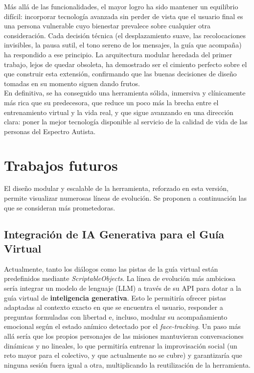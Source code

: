 \documentclass[12pt,twoside,titlepage]{report}
\begin{document}
Más allá de las funcionalidades, el mayor logro ha sido mantener un equilibrio difícil: incorporar tecnología avanzada sin perder de vista que el usuario final es una persona vulnerable cuyo bienestar prevalece sobre cualquier otra consideración.
Cada decisión técnica (el desplazamiento suave, las recolocaciones invisibles, la pausa sutil, el tono sereno de los mensajes, la guía que acompaña) ha respondido a ese principio.
La arquitectura modular heredada del primer trabajo, lejos de quedar obsoleta, ha demostrado ser el cimiento perfecto sobre el que construir esta extensión, confirmando que las buenas decisiones de diseño tomadas en su momento siguen dando frutos.\\

En definitiva, se ha conseguido una herramienta sólida, inmersiva y clínicamente más rica que su predecesora, que reduce un poco más la brecha entre el entrenamiento virtual y la vida real, y que sigue avanzando en una dirección clara: poner la mejor tecnología disponible al servicio de la calidad de vida de las personas del Espectro Autista.

\section{Trabajos futuros}

El diseño modular y escalable de la herramienta, reforzado en esta versión, permite visualizar numerosas líneas de evolución.
Se proponen a continuación las que se consideran más prometedoras.

\subsection{Integración de IA Generativa para el Guía Virtual}

Actualmente, tanto los diálogos como las pistas de la guía virtual están predefinidos mediante \textit{ScriptableObjects}.
La línea de evolución más ambiciosa sería integrar un modelo de lenguaje (LLM) a través de su API para dotar a la guía virtual de \textbf{inteligencia generativa}.
Esto le permitiría ofrecer pistas adaptadas al contexto exacto en que se encuentra el usuario, responder a preguntas formuladas con libertad e, incluso, modular su acompañamiento emocional según el estado anímico detectado por el \textit{face-tracking}.
Un paso más allá sería que los propios personajes de las misiones mantuvieran conversaciones dinámicas y no lineales, lo que permitiría entrenar la improvisación social (un reto mayor para el colectivo, y que actualmente no se cubre) y garantizaría que ninguna sesión fuera igual a otra, multiplicando la reutilización de la herramienta.
\end{document}
